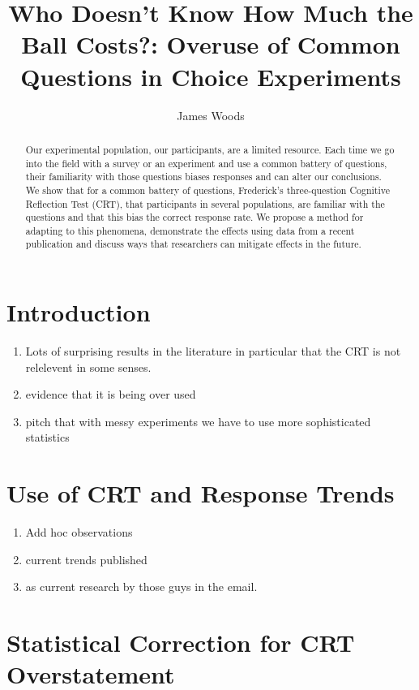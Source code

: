 \documentclass{article}
\author{James Woods}
\title{Who Doesn't Know How Much the Ball Costs?:  Overuse of Common Questions in Choice Experiments}
\begin{document}
\maketitle


\begin{abstract}

Our experimental population, our participants, are a limited resource.  Each time we go into the field with a survey or an experiment and use a common battery of questions, their familiarity with those questions biases responses and can alter our conclusions.  We show that for a common battery of questions, Frederick's three-question Cognitive Reflection Test (CRT),  that participants in several populations, are familiar with the questions and that this bias the correct response rate.  We propose a method for adapting to this phenomena, demonstrate the effects using data from a recent publication and discuss ways that researchers can mitigate effects in the future.

\end{abstract}


\section{Introduction}
  
  \begin{enumerate}
    \item Lots of surprising results in the literature in particular that the CRT is not relelevent in some senses.
    \item evidence that it is being over used
    \item pitch that with messy experiments we have to use more sophisticated statistics
  \end{enumerate}

\section{Use of CRT and Response Trends}
  
  \begin{enumerate}
      \item  Add hoc observations
      \item current trends published
      \item as current research by those guys in the email.
  \end{enumerate}

\section{Statistical Correction for CRT Overstatement}
\end{document}
